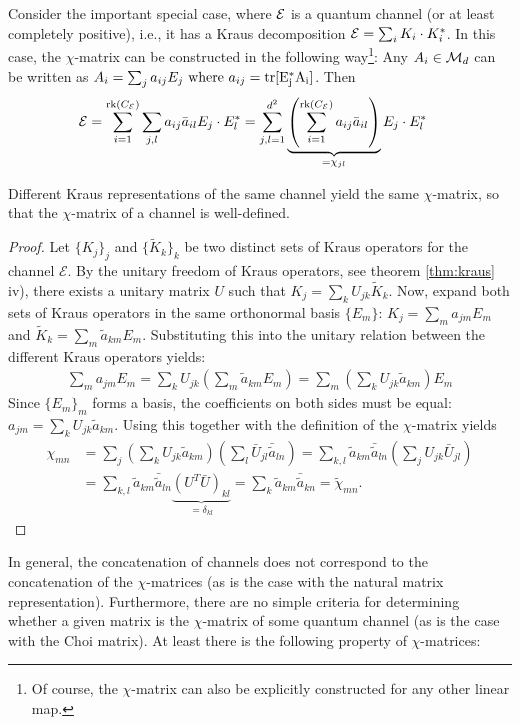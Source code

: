 Consider the important special case, where $\mathcal E$ is a quantum channel (or at least completely positive), i.e., it has a Kraus decomposition $\mathcal E = \sum_i K_i \cdot K_i^*$. In this case, the $\chi$-matrix can be constructed in the following way\footnote{Of course, the $\chi$-matrix can also be explicitly constructed for any other linear map.}: Any $A_i \in \mathcal M_d$ can be written as $
    A_i = \sum_j a_{ij}E_j \text{ where }a_{ij}=\mathrm{tr[E_j^*A_i]}$. Then
\begin{align}
\mathcal{E} &= \sum_{i=1}^{\text{rk}(C_{\mathcal E})} \sum_{j,l} a_{ij} \bar{a}_{il} E_j \cdot E_l^* = \sum_{j,l=1}^{d^2} \underbrace{\left( \sum_{i=1}^{\text{rk}(C_{\mathcal E})} a_{ij} \bar{a}_{il} \right)}_{= \chi_{jl}} E_j \cdot E_l^*\label{eq:chi}
\end{align}

\begin{prop}
Different Kraus representations of the same channel yield the same $\chi$-matrix, so that the $\chi$-matrix of a channel is well-defined.
\end{prop}
\begin{proof}
Let $\{K_j\}_j$ and $\{\tilde{K}_k\}_k$ be two distinct sets of Kraus operators for the channel $\mathcal{E}$. By the unitary freedom of Kraus operators, see theorem \ref{thm:kraus} iv), there exists a unitary matrix $U$ such that $
K_j = \sum_k U_{jk} \tilde{K}_k$. Now, expand both sets of Kraus operators in the same orthonormal basis $\{E_m\}$: $
K_j = \sum_m a_{jm} E_m$ and $ \tilde{K}_k = \sum_m \tilde{a}_{km} E_m$.
Substituting this into the unitary relation between the different Kraus operators yields:
\begin{align*}
\sum_m a_{jm} E_m = \sum_k U_{jk} \left( \sum_m \tilde{a}_{km} E_m \right) = \sum_m \left( \sum_k U_{jk} \tilde{a}_{km} \right) E_m
\end{align*}
Since $\{E_m\}_m$ forms a basis, the coefficients on both sides must be equal: $
a_{jm} = \sum_k U_{jk} \tilde{a}_{km}$. Using this together with the definition of the $\chi$-matrix yields
\begin{align*}
\chi_{mn} &= \sum_j \left( \sum_k U_{jk} \tilde{a}_{km} \right) \left( \sum_l \bar{U}_{jl} \bar{\tilde{a}}_{ln} \right) 
= \sum_{k,l} \tilde{a}_{km} \bar{\tilde{a}}_{ln} \left( \sum_j U_{jk} \bar{U}_{jl} \right)\\  &= \sum_{k,l} \tilde{a}_{km} \bar{\tilde{a}}_{ln}\underbrace{(U^T \bar{U})_{kl}}_{=\delta_{kl}} =\sum_k \tilde{a}_{km} \bar{\tilde{a}}_{kn} = \tilde \chi _{mn}.
\end{align*}
\end{proof}
In general, the concatenation of channels does not correspond to the concatenation of the $\chi$-matrices (as is the case with the natural matrix representation). Furthermore, there are no simple criteria for determining whether a given matrix is the $\chi$-matrix of some quantum channel (as is the case with the Choi matrix). At least there is the following property of $\chi$-matrices:

